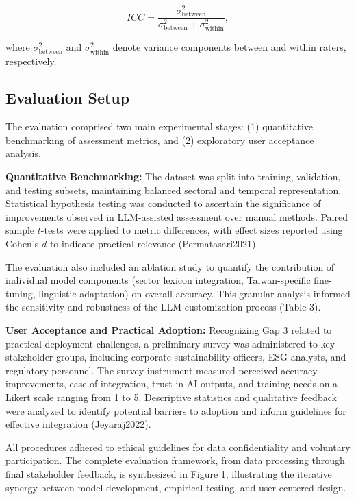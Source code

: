 \documentclass[
  12pt,
]{article}
\begin{document}
\[
ICC = \frac{\sigma^2_\text{between}}{\sigma^2_\text{between} + \sigma^2_\text{within}},
\]

where \(\sigma^2_\text{between}\) and \(\sigma^2_\text{within}\) denote
variance components between and within raters, respectively.

\subsection{Evaluation Setup}\label{evaluation-setup}

The evaluation comprised two main experimental stages: (1) quantitative
benchmarking of assessment metrics, and (2) exploratory user acceptance
analysis.

\textbf{Quantitative Benchmarking:} The dataset was split into training,
validation, and testing subsets, maintaining balanced sectoral and
temporal representation. Statistical hypothesis testing was conducted to
ascertain the significance of improvements observed in LLM-assisted
assessment over manual methods. Paired sample \(t\)-tests were applied
to metric differences, with effect sizes reported using Cohen's \(d\) to
indicate practical relevance (Permatasari2021).

The evaluation also included an ablation study to quantify the
contribution of individual model components (sector lexicon integration,
Taiwan-specific fine-tuning, linguistic adaptation) on overall accuracy.
This granular analysis informed the sensitivity and robustness of the
LLM customization process (Table 3).

\textbf{User Acceptance and Practical Adoption:} Recognizing Gap 3
related to practical deployment challenges, a preliminary survey was
administered to key stakeholder groups, including corporate
sustainability officers, ESG analysts, and regulatory personnel. The
survey instrument measured perceived accuracy improvements, ease of
integration, trust in AI outputs, and training needs on a Likert scale
ranging from 1 to 5. Descriptive statistics and qualitative feedback
were analyzed to identify potential barriers to adoption and inform
guidelines for effective integration (Jeyaraj2022).

All procedures adhered to ethical guidelines for data confidentiality
and voluntary participation. The complete evaluation framework, from
data processing through final stakeholder feedback, is synthesized in
Figure 1, illustrating the iterative synergy between model development,
empirical testing, and user-centered design.
\end{document}
